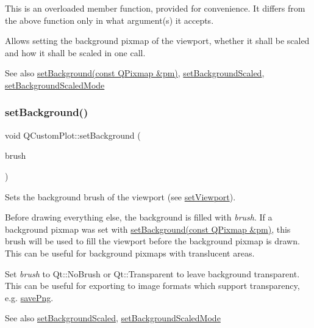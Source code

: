 This is an overloaded member function, provided for convenience. It differs from the above function only in what argument(s) it accepts.

Allows setting the background pixmap of the viewport, whether it shall be scaled and how it shall be scaled in one call.

\begin{DoxySeeAlso}{See also}
\hyperlink{class_q_custom_plot_a130358592cfca353ff3cf5571b49fb00}{set\+Background(const Q\+Pixmap \&pm)}, \hyperlink{class_q_custom_plot_a36f0fa1317325dc7b7efea615ee2de1f}{set\+Background\+Scaled}, \hyperlink{class_q_custom_plot_a4c0eb4865b7949f62e1cb97db04a3de0}{set\+Background\+Scaled\+Mode} 
\end{DoxySeeAlso}
\hypertarget{class_q_custom_plot_a8ed256cf467bfa7ba1f9feaae62c3bd0}{}\label{class_q_custom_plot_a8ed256cf467bfa7ba1f9feaae62c3bd0} 
\subsubsection{\texorpdfstring{set\+Background()}{setBackground()}\hspace{0.1cm}{\footnotesize\ttfamily [3/3]}}
{\footnotesize\ttfamily void Q\+Custom\+Plot\+::set\+Background (\begin{DoxyParamCaption}\item[{const Q\+Brush \&}]{brush }\end{DoxyParamCaption})}

Sets the background brush of the viewport (see \hyperlink{class_q_custom_plot_a3f9bc4b939dd8aaba9339fd09f273fc4}{set\+Viewport}).

Before drawing everything else, the background is filled with {\itshape brush}. If a background pixmap was set with \hyperlink{class_q_custom_plot_a130358592cfca353ff3cf5571b49fb00}{set\+Background(const Q\+Pixmap \&pm)}, this brush will be used to fill the viewport before the background pixmap is drawn. This can be useful for background pixmaps with translucent areas.

Set {\itshape brush} to Qt\+::\+No\+Brush or Qt\+::\+Transparent to leave background transparent. This can be useful for exporting to image formats which support transparency, e.\+g. \hyperlink{class_q_custom_plot_a7636261aff1f6d25c9da749ece3fc8b8}{save\+Png}.

\begin{DoxySeeAlso}{See also}
\hyperlink{class_q_custom_plot_a36f0fa1317325dc7b7efea615ee2de1f}{set\+Background\+Scaled}, \hyperlink{class_q_custom_plot_a4c0eb4865b7949f62e1cb97db04a3de0}{set\+Background\+Scaled\+Mode} 
\end{DoxySeeAlso}
\hypertarget{class_q_custom_plot_a36f0fa1317325dc7b7efea615ee2de1f}{}\label{class_q_custom_plot_a36f0fa1317325dc7b7efea615ee2de1f} 
